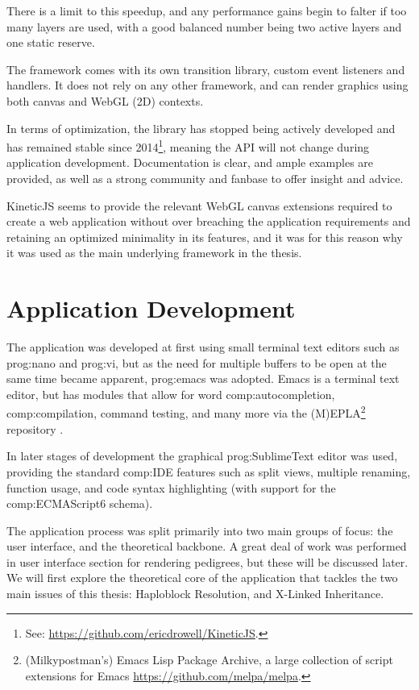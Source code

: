 There is a limit to this speedup, and any performance gains begin to falter if too many layers are used, with a good balanced number being two active layers and one static reserve.

The framework comes with its own transition library, custom event listeners and handlers. It does not rely on any other framework, and can render graphics using both canvas and WebGL (2D) contexts.

In terms of optimization, the library has stopped being actively developed and has remained stable since 2014\footnote{See: \url{https://github.com/ericdrowell/KineticJS}.}, meaning the API will not change during application development. Documentation is clear, and ample examples are provided, as well as a strong community and fanbase to offer insight and advice.

KineticJS seems to provide the relevant WebGL canvas extensions required to create a web application without over breaching the application requirements and retaining an optimized minimality in its features, and it was for this reason why it was used as the main underlying framework in the thesis.

\section{Application Development}

The application was developed at first using small terminal text editors such as \gls{prog:nano} and \gls{prog:vi}, but as the need for multiple buffers to be open at the same time became apparent, \gls{prog:emacs} was adopted. Emacs is a terminal text editor, but has modules that allow for word \gls{comp:autocompletion}, \gls{comp:compilation}, command testing, and many more via the (M)EPLA\footnote{(Milkypostman's) Emacs Lisp Package Archive, a large collection of script extensions for Emacs \url{https://github.com/melpa/melpa}.} repository \cite{stallman1981emacs}.

In later stages of development the graphical \gls{prog:SublimeText} editor was used, providing the standard \gls{comp:IDE} features such as split views, multiple renaming, function usage, and code syntax highlighting (with support for the \gls{comp:ECMAScript6} schema).

The application process was split primarily into two main groups of focus: the user interface, and the theoretical backbone. A great deal of work was performed in user interface section for rendering pedigrees, but these will be discussed later. We will first explore the theoretical core of the application that tackles the two main issues of this thesis: Haploblock Resolution, and X-Linked Inheritance. 


